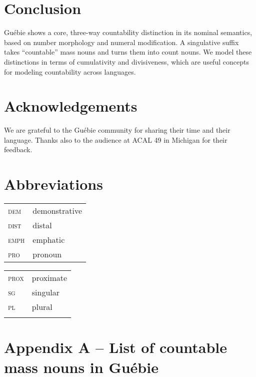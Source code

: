 \documentclass[output=paper,colorlinks,citecolor=brown]{langscibook}
\begin{document}
\section{Conclusion}\label{sec:sande:5}

Guébie shows a core, three-way countability distinction in its nominal semantics, based on number morphology and numeral modification. A singulative suffix takes ``countable'' mass nouns and turns them into count nouns. We model these distinctions in terms of cumulativity and divisiveness, which are useful concepts for modeling countability across languages.

\section*{Acknowledgements}

We are grateful to the Guébie community for sharing their time and their language. Thanks also to the audience at ACAL 49 in Michigan for their feedback.

\section*{Abbreviations}
\begin{tabularx}{.55\textwidth}{ll}
\textsc{dem} & demonstrative\\
\textsc{dist} & distal\\
\textsc{emph} & emphatic\\
\textsc{pro} & pronoun\\
\end{tabularx}
\begin{tabularx}{.45\textwidth}{ll}
\textsc{prox} & proximate\\
\textsc{sg} & singular\\
\textsc{pl} & plural\\
\\
\end{tabularx}

\section*{Appendix A -- List of countable mass nouns in Guébie}
\end{document}
